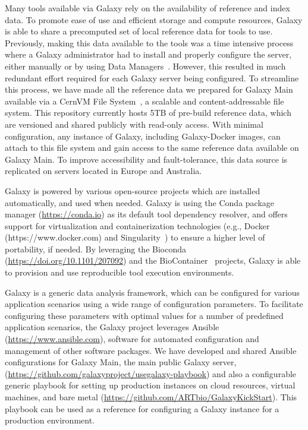 Many tools available via Galaxy rely on the availability of reference and index data. To promote ease of use and efficient storage and compute resources, Galaxy is able to share a precomputed set of local reference data for tools to use. Previously, making this data available to the tools was a time intensive process where a Galaxy administrator had to install and properly configure the server, either manually or by using Data Managers~\cite{blankenberg2014wrangling}. However, this resulted in much redundant effort required for each Galaxy server being configured. To streamline this process, we have made all the reference data we prepared for Galaxy Main available via a CernVM File System~\cite{blomer2012status}, a scalable and content-addressable file system. This repository currently hosts 5TB of pre-build reference data, which are versioned and shared publicly with read-only access. With minimal configuration, any instance of Galaxy, including Galaxy-Docker images, can attach to this file system and gain access to the same reference data available on Galaxy Main. To improve accessibility and fault-tolerance, this data source is replicated on servers located in Europe and Australia.

Galaxy is powered by various open-source projects which are installed automatically, and used when needed. Galaxy is using the Conda package manager (\url{https://conda.io}) as its default tool dependency resolver, and offers support for virtualization and containerization technologies (e.g., Docker (https://www.docker.com) and Singularity~\cite{kurtzer2017singularity}) to ensure a higher level of portability, if needed. By leveraging the Bioconda (\url{https://doi.org/10.1101/207092}) and the BioContainer~\cite{da2017biocontainers} projects, Galaxy is able to provision and use reproducible tool execution environments.

Galaxy is a generic data analysis framework, which can be configured for various application scenarios using a wide range of configuration parameters. To facilitate configuring these parameters with optimal values for a number of predefined application scenarios, the Galaxy project leverages Ansible (\url{https://www.ansible.com}), software for automated configuration and management of other software packages. We have developed and shared Ansible configurations for Galaxy Main, the main public Galaxy server, (\url{https://github.com/galaxyproject/usegalaxy-playbook}) and also a configurable generic playbook for setting up production instances on cloud resources, virtual machines, and bare metal (\url{https://github.com/ARTbio/GalaxyKickStart}). This playbook can be used as a reference for configuring a Galaxy instance for a production environment.

